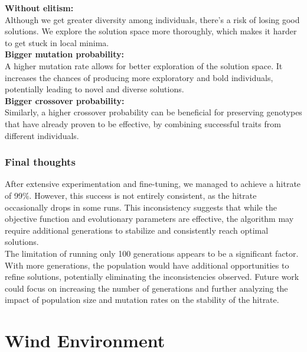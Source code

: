 \documentclass[a4paper, 12pt, fleqn]{report}
\begin{document}
\noindent
\textbf{Without elitism:}\\
Although we get greater diversity among individuals, there's a risk of losing good solutions.
We explore the solution space more thoroughly, which makes it harder to get stuck in local minima.\\

\noindent
\textbf{Bigger mutation probability:}\\
A higher mutation rate allows for better exploration of the solution space.
It increases the chances of producing more exploratory and bold individuals, potentially leading to novel and diverse solutions.\\

\noindent
\textbf{Bigger crossover probability:}\\
Similarly, a higher crossover probability can be beneficial for preserving genotypes that have already proven to be effective, by combining successful traits from different individuals.
\noindent





\subsubsection{Final thoughts}

After extensive experimentation and fine-tuning, we managed to achieve a hitrate of 99\%. However, this success is not entirely consistent, as the hitrate occasionally drops in some runs. This inconsistency suggests that while the objective function and evolutionary parameters are effective, the algorithm may require additional generations to stabilize and consistently reach optimal solutions.
\\

\noindent
The limitation of running only 100 generations appears to be a significant factor. With more generations, the population would have additional opportunities to refine solutions, potentially eliminating the inconsistencies observed. Future work could focus on increasing the number of generations and further analyzing the impact of population size and mutation rates on the stability of the hitrate.
\\

\newpage
\section*{\fontsize{16}{20}\selectfont Wind Environment}
\end{document}
